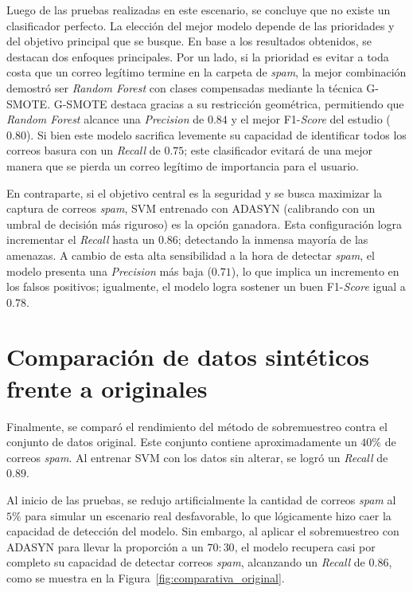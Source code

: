 \documentclass[a4paper,11pt ,openany]{book}
\begin{document}
Luego de las pruebas realizadas en este escenario, se concluye que no existe un clasificador perfecto. La elección del mejor modelo depende de las prioridades y del objetivo principal que se busque. En base a los resultados obtenidos, se destacan dos enfoques principales.
Por un lado, si la prioridad es evitar a toda costa que un correo legítimo termine en la carpeta de \textit{spam}, la mejor combinación demostró ser \textit{Random Forest} con clases compensadas mediante la técnica G-SMOTE. G-SMOTE destaca gracias a su restricción geométrica, permitiendo que \textit{Random Forest} alcance una \textit{Precision} de $0.84$ y el mejor F1-\textit{Score} del estudio ($0.80$). Si bien este modelo sacrifica levemente su capacidad de identificar todos los correos basura con un \textit{Recall} de $0.75$; este clasificador evitará de una mejor manera que se pierda un correo legítimo de importancia para el usuario.

En contraparte, si el objetivo central es la seguridad y se busca maximizar la captura de correos \textit{spam}, SVM entrenado con ADASYN (calibrando con un umbral de decisión más riguroso) es la opción ganadora. Esta configuración logra incrementar el \textit{Recall} hasta un $0.86$; detectando la inmensa mayoría de las amenazas. A cambio de esta alta sensibilidad a la hora de detectar \textit{spam}, el modelo presenta una \textit{Precision} más baja ($0.71$), lo que implica un incremento en los falsos positivos; igualmente, el modelo logra sostener un buen F1-\textit{Score} igual a $0.78$.

\section{Comparación de datos sintéticos frente a originales}

Finalmente, se comparó el rendimiento del método de sobremuestreo contra el conjunto de datos original. Este conjunto  contiene aproximadamente un $40\%$ de correos \textit{spam}. Al entrenar SVM con los datos sin alterar, se logró un \textit{Recall} de $0.89$.

Al inicio de las pruebas, se redujo artificialmente la cantidad de correos \textit{spam} al $5\%$ para simular un escenario real desfavorable, lo que lógicamente hizo caer la capacidad de detección del modelo. Sin embargo, al aplicar el sobremuestreo con ADASYN para llevar la proporción a un $70:30$, el modelo recupera casi por completo su capacidad de detectar correos \textit{spam}, alcanzando un \textit{Recall} de $0.86$, como se muestra en la Figura~\ref{fig:comparativa_original}.
\end{document}
